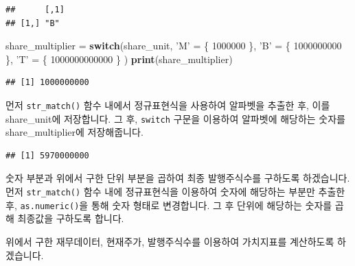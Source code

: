 \documentclass[12pt,]{book}
\newenvironment{Shaded}{\begin{snugshade}}{\end{snugshade}}
\newcommand{\ControlFlowTok}[1]{\textcolor[rgb]{0.13,0.29,0.53}{\textbf{#1}}}
\newcommand{\DecValTok}[1]{\textcolor[rgb]{0.00,0.00,0.81}{#1}}
\newcommand{\KeywordTok}[1]{\textcolor[rgb]{0.13,0.29,0.53}{\textbf{#1}}}
\newcommand{\NormalTok}[1]{#1}
\newcommand{\OperatorTok}[1]{\textcolor[rgb]{0.81,0.36,0.00}{\textbf{#1}}}
\newcommand{\StringTok}[1]{\textcolor[rgb]{0.31,0.60,0.02}{#1}}
\begin{document}
\begin{verbatim}
##      [,1]
## [1,] "B"
\end{verbatim}

\begin{Shaded}
\begin{Highlighting}[]
\NormalTok{share_multiplier =}\StringTok{ }\ControlFlowTok{switch}\NormalTok{(share_unit, }
       \StringTok{'M'}\NormalTok{ =}\StringTok{ }\NormalTok{\{ }\DecValTok{1000000}\NormalTok{ \},}
       \StringTok{'B'}\NormalTok{ =}\StringTok{ }\NormalTok{\{ }\DecValTok{1000000000}\NormalTok{ \},}
       \StringTok{'T'}\NormalTok{ =}\StringTok{ }\NormalTok{\{ }\DecValTok{1000000000000}\NormalTok{ \}}
\NormalTok{)}
\KeywordTok{print}\NormalTok{(share_multiplier)}
\end{Highlighting}
\end{Shaded}

\begin{verbatim}
## [1] 1000000000
\end{verbatim}

먼저 \texttt{str\_match()} 함수 내에서 정규표현식을 사용하여 알파벳을 추출한 후, 이를 share\_unit에 저장합니다. 그 후, \texttt{switch} 구문을 이용하여 알파벳에 해당하는 숫자를 share\_multiplier에 저장해줍니다.

\begin{Shaded}
\end{Shaded}

\begin{verbatim}
## [1] 5970000000
\end{verbatim}

숫자 부분과 위에서 구한 단위 부분을 곱하여 최종 발행주식수를 구하도록 하겠습니다. 먼저 \texttt{str\_match()} 함수 내에 정규표현식을 이용하여 숫자에 해당하는 부분만 추출한 후, \texttt{as.numeric()}을 통해 숫자 형태로 변경합니다. 그 후 단위에 해당하는 숫자를 곱해 최종값을 구하도록 합니다.

위에서 구한 재무데이터, 현재주가, 발행주식수를 이용하여 가치지표를 계산하도록 하겠습니다.
\end{document}

